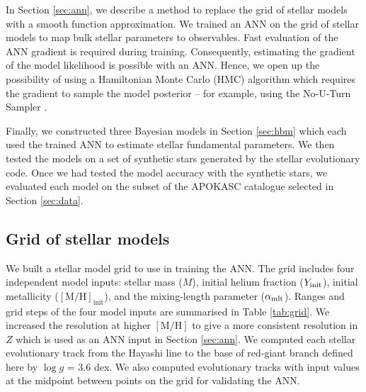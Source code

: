 \documentclass[a4paper,fleqn,usenatbib]{mnras}
\newcommand{\metallicity}{\ensuremath{[\mathrm{M}/\mathrm{H}]}}
\begin{document}
In Section \ref{sec:ann}, we describe a method to replace the grid of stellar models with a smooth function approximation. We trained an ANN on the grid of stellar models to map bulk stellar parameters to observables. Fast evaluation of the ANN gradient is required during training. Consequently, estimating the gradient of the model likelihood is possible with an ANN. Hence, we open up the possibility of using a Hamiltonian Monte Carlo (HMC) algorithm which requires the gradient to sample the model posterior -- for example, using the No-U-Turn Sampler \citep[NUTS;][]{Hoffman.Gelman2014}.

Finally, we constructed three Bayesian models in Section \ref{sec:hbm} which each used the trained ANN to estimate stellar fundamental parameters. We then tested the models on a set of synthetic stars generated by the stellar evolutionary code. Once we had tested the model accuracy with the synthetic stars, we evaluated each model on the subset of the APOKASC catalogue selected in Section \ref{sec:data}.

\subsection{Grid of stellar models}\label{sec:grid}

We built a stellar model grid to use in training the ANN. The grid includes four independent model inputs: stellar mass ($M$), initial helium fraction ($Y_{\rm init}$), initial metallicity ($\mathrm{[M/H]}_\mathrm{init}$), and the mixing-length parameter ($\alpha_{\rm mlt}$).  Ranges and grid steps of the four model inputs are summarised in Table \ref{tab:grid}. We increased the resolution at higher $\metallicity$ to give a more consistent resolution in $Z$ which is used as an ANN input in Section \ref{sec:ann}. We computed each stellar evolutionary track from the Hayashi line to the base of red-giant branch defined here by $\log g$ = 3.6 dex. We also computed evolutionary tracks with input values at the midpoint between points on the grid for validating the ANN.
\end{document}
